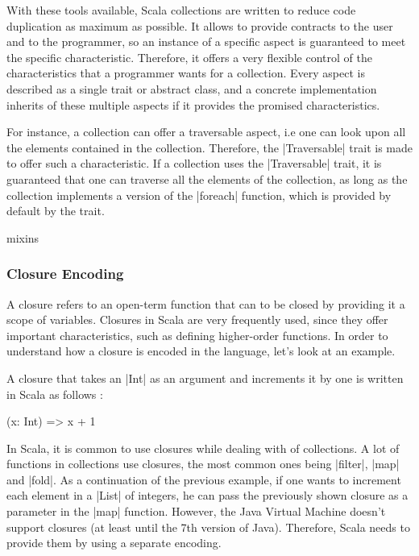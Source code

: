 With these tools available, Scala collections are written to reduce code duplication as maximum as possible.  It allows to provide contracts to the user and to the programmer, so an instance of a specific aspect is guaranteed to meet the specific characteristic. Therefore, it offers a very flexible control of the characteristics that a programmer wants for a collection. Every aspect is described as a single trait or abstract class, and a concrete implementation inherits of these multiple aspects if it provides the promised characteristics.

For instance, a collection can offer a traversable aspect, i.e one can look upon all the elements contained in the collection. Therefore, the |Traversable| trait is made to offer such a characteristic. If a collection uses the |Traversable| trait, it is guaranteed that one can traverse all the elements of the collection, as long as the collection implements a version of the |foreach| function, which is provided by default by the trait.



mixins \cite{scalable-component-abstractions}

\subsubsection{Closure Encoding}

A closure refers to an open-term function that can to be closed by providing it a scope of variables. Closures in Scala are very frequently used, since they offer important characteristics, such as defining higher-order functions. In order to understand how a closure is encoded in the language, let's look at an example.

A closure that takes an |Int| as an argument and increments it by one is written in Scala as follows :

\begin{lstlisting-nobreak}
 (x: Int) => x + 1
\end{lstlisting-nobreak}

In Scala, it is common to use closures while dealing with of collections. A lot of functions in collections use closures, the most common ones being |filter|, |map| and |fold|. As a continuation of the previous example, if one wants to increment each element in a |List| of integers, he can pass the previously shown closure as a parameter in the |map| function. However, the Java Virtual Machine doesn't support closures (at least until the 7th version of Java). Therefore, Scala needs to provide them by using a separate encoding.

